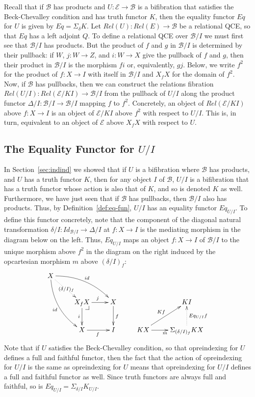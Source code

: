 \documentclass{LMCS}
\makeatletter
\newcommand{\ra}{\rightarrow}
\newcommand\lpbc[1][dr]{\save*!/#1-1.2pc/#1:(-1,1)@^{|-}\restore}
\newcommand\E{{\mathcal E}}
\newcommand\B{{\mathcal B}}
\theoremstyle{plain}
\theoremstyle{remark}
\theoremstyle{definition}
\makeatother
\begin{document}
Recall that if $\B$ has products and $U:\E \to \B$ is a bifibration
that satisfies the Beck-Chevalley condition and has truth functor $K$,
then the equality functor $Eq$ for $U$ is given by $Eq =
\Sigma_{\delta} K$. Let $Rel(U):Rel(E) \ra \B$ be a relational QCE, so
that $Eq$ has a left adjoint $Q$. To define a relational QCE over
$\B/I$ we must first see that $\B/I$ has products. But the product of
$f$ and $g$ in $\B/I$ is determined by their pullback: if $W$, $j: W
\to Z$, and $i : W \to X$ give the pullback of $f$ and $g$, then their
product in $\B/I$ is the morphism $fi$ or, equivalently, $gj$. Below,
we write $f^2$ for the product of $f : X \to I$ with itself in $\B/I$
and $X_fX$ for the domain of $f^2$. Now, if $\B$ has pullbacks, then
we can construct the relations fibration $Rel(U/I):Rel(\E/KI)\to \B/I$
from the pullback of $U/I$ along the product functor $\Delta/I :\B/I
\ra \B/I$ mapping $f$ to $f^2$. Concretely, an object of $Rel(\E/KI)$
above $f:X \ra I$ is an object of $\E/KI$ above $f^2$ with respect to
$U/I$. This is, in turn, equivalent to an object of $\E$ above $X_fX$
with respect to $U$.

\subsection{The Equality Functor for $U/I$}\label{sec:eqU/I}

In Section~\ref{sec:indind} we showed that if $U$ is a bifibration
where $\B$ has products, and $U$ has a truth functor $K$, then for any
object $I$ of $\B$, $U/I$ is a bifibration that has a truth functor
whose action is also that of $K$, and so is denoted $K$ as
well. Furthermore, we have just seen that if $\B$ has pullbacks, then
$\B/I$ also has products.  Thus, by Definition~\ref{def:eq-fun}, $U/I$
has an equality functor $Eq_{U/I}$. To define this functor concretely,
note that the component of the diagonal natural transformation
$\delta/I:\mathit{Id}_{\B/I} \ra \Delta/I$ at $f:X \ra I$ is the
mediating morphism in the diagram below on the left.  Thus, $Eq_{U/I}$
maps an object $f : X \ra I$ of $\B/I$ to the unique morphism above
$f^2$ in the diagram on the right induced by the opcartesian morphism
$m$ above $(\delta/I)_f$:
\[\xymatrix{
  X \ar@/_1pc/[rdd]_{id} \ar@{.>}[rd]|{(\delta/I)_f}
  \ar@/^1pc/[rrd]^{id}\\ &X_fX \ar[d]_i \ar[r]^j \lpbc & \ar[d]^f X &
  & KI \\ &X \ar[r]_f &I & KX \ar[ru]^{Kf} \ar[r]_{m} &
  \Sigma_{(\delta/I)_f}KX \ar@{.>}[u]_{Eq_{U/I}f}}
\] 
Note that if $U$ satisfies the Beck-Chevalley condition, so that
opreindexing for $U$ defines a full and faithful functor, then the
fact that the action of opreindexing for $U/I$ is the same as
opreindexing for $U$ means that opreindexing for $U/I$ defines a full
and faithful functor as well.
Since truth functors are always full and
  faithful, so is $Eq_{U/I} = \Sigma_{\delta/I} K_{U/I}$.
\end{document}
